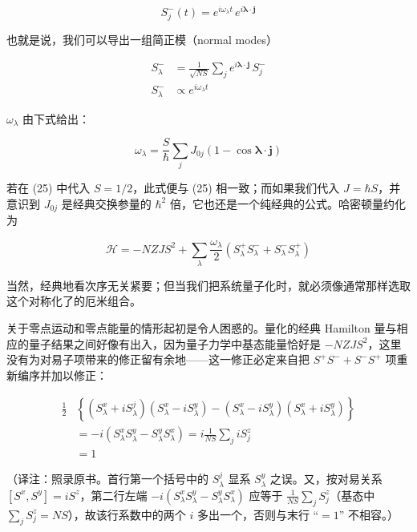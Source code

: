 \begin{equation*}
S^{-}_{j}(t) = e^{i\omega_{\lambda} t}\, e^{i\boldsymbol{\lambda}\cdot\mathbf{j}}
\end{equation*}

也就是说，我们可以导出一组简正模（normal modes）

\begin{align*}
S^{-}_{\lambda} &= \frac{1}{\sqrt{NS}}\sum_{j} e^{i\boldsymbol{\lambda}\cdot\mathbf{j}}\, S^{-}_{j} \\
S^{-}_{\lambda} &\propto e^{i\omega_{\lambda} t}
\end{align*}

$\omega_{\lambda}$ 由下式给出：

\begin{equation*}
\omega_{\lambda} = \frac{S}{\hbar}\sum_{j} J_{0j}\left(1 - \cos\boldsymbol{\lambda}\cdot\mathbf{j}\right)
\end{equation*}

若在 (25) 中代入 $S = 1/2$，此式便与 (25) 相一致；而如果我们代入 $J = \hbar S$，并意识到 $J_{0j}$ 是经典交换参量的 $\hbar^{2}$ 倍，它也还是一个纯经典的公式。哈密顿量约化为

\begin{equation*}
\mathcal{H} = -NZJS^{2} + \sum_{\lambda} \frac{\omega_{\lambda}}{2}\left(S^{+}_{\lambda}S^{-}_{\lambda} + S^{-}_{\lambda}S^{+}_{\lambda}\right) \tag{26}
\end{equation*}

当然，经典地看次序无关紧要；但当我们把系统量子化时，就必须像通常那样选取这个对称化了的厄米组合。

关于零点运动和零点能量的情形起初是令人困惑的。量化的经典 Hamilton 量与相应的量子结果之间好像有出入，因为量子力学中基态能量恰好是 $-NZJS^{2}$，这里没有为对易子项带来的修正留有余地——这一修正必定来自把 $S^{+}S^{-} + S^{-}S^{+}$ 项重新编序并加以修正：

\begin{align*}
\frac{1}{2}&\left\{\left(S^{x}_{\lambda} + iS^{j}_{\lambda}\right)\left(S^{x}_{\lambda} - iS^{y}_{\lambda}\right) - \left(S^{x}_{\lambda} - iS^{y}_{\lambda}\right)\left(S^{x}_{\lambda} + iS^{y}_{\lambda}\right)\right\} \\
&= -i\left(S^{x}_{\lambda}S^{y}_{\lambda} - S^{y}_{\lambda}S^{x}_{\lambda}\right) = i\frac{1}{NS}\sum_{j} iS^{z}_{j} \\
&= 1
\end{align*}

（译注：照录原书。首行第一个括号中的 $S^{j}_{\lambda}$ 显系 $S^{y}_{\lambda}$ 之误。又，按对易关系 $[S^{x},S^{y}] = iS^{z}$，第二行左端 $-i(S^{x}_{\lambda}S^{y}_{\lambda} - S^{y}_{\lambda}S^{x}_{\lambda})$ 应等于 $\frac{1}{NS}\sum_{j} S^{z}_{j}$（基态中 $\sum_{j}S^{z}_{j} = NS$），故该行系数中的两个 $i$ 多出一个，否则与末行 “$= 1$” 不相容。）

